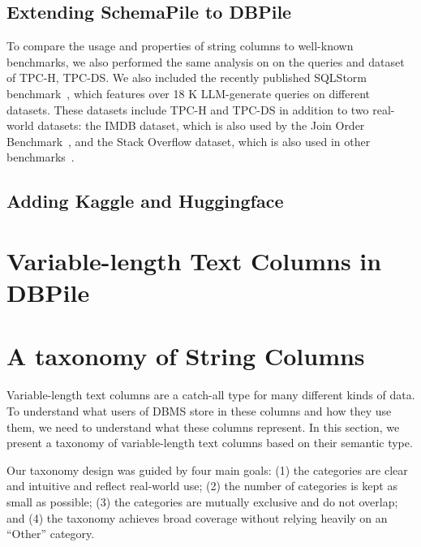 \subsection{Extending SchemaPile to DBPile}
\label{subsec:sqlpile-dataset}

To compare the usage and properties of string columns to well-known benchmarks, we also performed the same analysis on
on the queries and dataset of TPC-H, TPC-DS.
We also included the recently published SQLStorm benchmark~\cite{schmidt_sqlstorm_2025}, which features over 18 K \ac{LLM}-generate queries on
different datasets.
These datasets include TPC-H and TPC-DS in addition to two real-world datasets: the IMDB dataset, which is also
used by the Join Order Benchmark~\cite{leis_how_2015}, and the Stack Overflow dataset,
which is also used in other benchmarks~\cite{han_cardinality_2021, marcus_bao_2021}.

\subsection{Adding Kaggle and Huggingface}\label{subsec:kaggle-datasets}


\section{Variable-length Text Columns in DBPile}\label{sec:strings-in-dbpile}




\section{A taxonomy of String Columns}\label{sec:semantic-type}
Variable-length text columns are a catch-all type for many different kinds of data.
To understand what users
of \ac{DBMS} store in these columns and how they use them, we need to understand what these columns represent.
In this section, we present a taxonomy of variable-length text columns based on their semantic type.


Our taxonomy design was guided by four main goals: (1) the categories are clear and intuitive and reflect
real-world use; (2) the number of categories is kept as small as possible; (3) the categories are mutually
exclusive and do not overlap; and (4) the taxonomy achieves broad coverage without relying heavily on an “Other” category.


